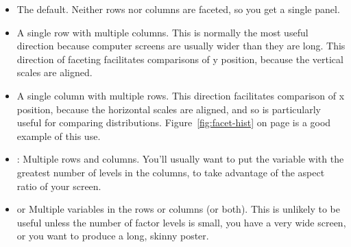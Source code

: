 \begin{itemize}
  \item {}   The default. Neither rows nor columns are faceted, so you get a single panel.

    

  \item {} A single row with multiple columns.  This is normally the most useful direction because computer screens are usually wider than they are long.  This direction of faceting facilitates comparisons of y position, because the vertical scales are aligned.

    
  
  \item {} A single column with multiple rows.  This direction facilitates comparison of x position, because the horizontal scales are aligned, and so is particularly useful for comparing distributions.  Figure~\ref{fig:facet-hist} on page \pageref{fig:facet-hist} is a good example of this use.

    

  \item {}: Multiple rows and columns.  You'll usually want to put the variable with the greatest number of levels in the columns, to take advantage of the aspect ratio of your screen.

    

  \item {} or   Multiple variables in the rows or columns (or both). This is unlikely to be useful unless the number of factor levels is small, you have a very wide screen, or you want to produce a long, skinny poster.

    

\end{itemize}

